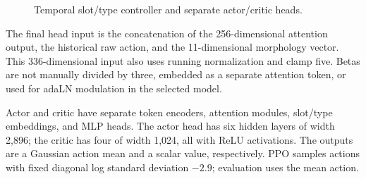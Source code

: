 \begin{figure}[t]
\centering
{}
\caption{Temporal slot/type controller and separate actor/critic heads.}\label{fig:network}
\end{figure}

The final head input is the concatenation of the 256-dimensional attention
output, the historical raw action, and the 11-dimensional morphology vector.
This 336-dimensional input also uses running normalization and clamp five.
Betas are not manually divided by three, embedded as a separate attention
token, or used for adaLN modulation in the selected model.

Actor and critic have separate token encoders, attention modules, slot/type
embeddings, and MLP heads. The actor head has six hidden layers of width
2,896; the critic has four of width 1,024, all with ReLU activations.
The outputs are a Gaussian action mean and a scalar value, respectively.
PPO samples actions with fixed diagonal log standard deviation $-2.9$;
evaluation uses the mean action.

